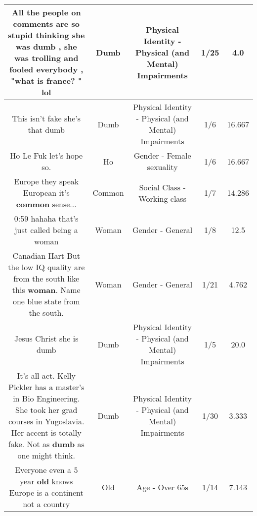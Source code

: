 \documentclass[11pt]{article}
\newlength\mylength
\begin{document}
\begin{center}
\begin{longtable}{|C{.65\mylength}|C{.30\mylength}|C{.12\mylength}|C{.12\mylength}|C{.12\mylength}|}
  \small All the people on comments are so stupid thinking she was \textbf{dumb} , she was trolling and fooled everybody , "what is france? " lol\normalsize   & Dumb & Physical Identity - Physical (and Mental) Impairments & 1/25 & 4.0 \\  \hline
  \small This isn't fake she's that dumb\normalsize   & Dumb & Physical Identity - Physical (and Mental) Impairments & 1/6 & 16.667 \\  \hline
  \small Ho Le Fuk let's hope so.\normalsize   & Ho & Gender - Female sexuality & 1/6 & 16.667 \\  \hline
  \small Europe they speak European it's \textbf{common} sense...\normalsize   & Common & Social Class - Working class & 1/7 & 14.286 \\  \hline
  \small 0:59 hahaha that's just called being a woman\normalsize   & Woman & Gender - General & 1/8 & 12.5 \\  \hline
  \small Canadian Hart But the low IQ quality are from the south like this \textbf{woman}. Name one blue state from the south.\normalsize   & Woman & Gender - General & 1/21 & 4.762 \\  \hline
  \small Jesus Christ she is dumb\normalsize   & Dumb & Physical Identity - Physical (and Mental) Impairments & 1/5 & 20.0 \\  \hline
  \small It's all act. Kelly Pickler has  a master's in Bio Engineering.  She took her grad courses in Yugoslavia.  Her accent is totally fake. Not as \textbf{dumb} as one might think.\normalsize   & Dumb & Physical Identity - Physical (and Mental) Impairments & 1/30 & 3.333 \\  \hline
  \small Everyone even a 5 year \textbf{old} knows Europe is a continent not a country\normalsize   & Old & Age - Over 65s & 1/14 & 7.143 \\  \hline

\end{longtable}
\end{center}
\end{document}
